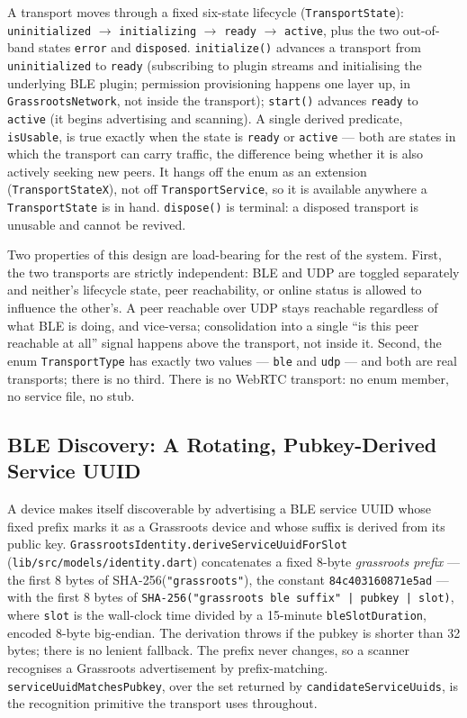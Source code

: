 \documentclass[11pt]{report}
\newcommand{\code}[1]{\texttt{\small #1}}
\begin{document}
A transport moves through a fixed six-state lifecycle (\code{TransportState}): \code{uninitialized} $\rightarrow$ \code{initializing} $\rightarrow$ \code{ready} $\rightarrow$ \code{active}, plus the two out-of-band states \code{error} and \code{disposed}. \code{initialize()} advances a transport from \code{uninitialized} to \code{ready} (subscribing to plugin streams and initialising the underlying BLE plugin; permission provisioning happens one layer up, in \code{GrassrootsNetwork}, not inside the transport); \code{start()} advances \code{ready} to \code{active} (it begins advertising and scanning). A single derived predicate, \code{isUsable}, is true exactly when the state is \code{ready} or \code{active} --- both are states in which the transport can carry traffic, the difference being whether it is also actively seeking new peers. It hangs off the enum as an extension (\code{TransportStateX}), not off \code{TransportService}, so it is available anywhere a \code{TransportState} is in hand. \code{dispose()} is terminal: a disposed transport is unusable and cannot be revived.

Two properties of this design are load-bearing for the rest of the system. First, the two transports are strictly independent: BLE and UDP are toggled separately and neither's lifecycle state, peer reachability, or online status is allowed to influence the other's. A peer reachable over UDP stays reachable regardless of what BLE is doing, and vice-versa; consolidation into a single ``is this peer reachable at all'' signal happens above the transport, not inside it. Second, the enum \code{TransportType} has exactly two values --- \code{ble} and \code{udp} --- and both are real transports; there is no third. There is no WebRTC transport: no enum member, no service file, no stub.

\subsection{BLE Discovery: A Rotating, Pubkey-Derived Service UUID}

A device makes itself discoverable by advertising a BLE service UUID whose fixed prefix marks it as a Grassroots device and whose suffix is derived from its public key. \code{GrassrootsIdentity.deriveServiceUuidForSlot} (\code{lib/src/models/identity.dart}) concatenates a fixed 8-byte \emph{grassroots prefix} --- the first 8 bytes of SHA-256(\code{"grassroots"}), the constant \code{84c403160871e5ad} --- with the first 8 bytes of \code{SHA-256("grassroots ble suffix" | pubkey | slot)}, where \code{slot} is the wall-clock time divided by a 15-minute \code{bleSlotDuration}, encoded 8-byte big-endian. The derivation throws if the pubkey is shorter than 32 bytes; there is no lenient fallback. The prefix never changes, so a scanner recognises a Grassroots advertisement by prefix-matching. \code{serviceUuidMatchesPubkey}, over the set returned by \code{candidateServiceUuids}, is the recognition primitive the transport uses throughout.
\end{document}
